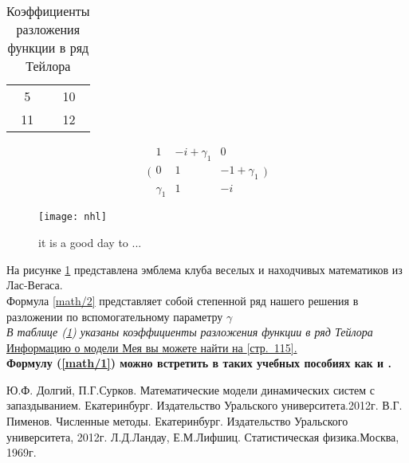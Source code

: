 \documentclass[12pt]{article}
\begin{document}
  \begin{table}
      \centering
      \begin{tabular}{ | c c |}
         \hline
           5 & 10 \\
          11 & 12 \\
          \hline
      \end{tabular}
      \caption{ Коэффициенты разложения функции в ряд Тейлора}
      \label{tab 1l}
  \end{table}
  \[ \Bigg(
  \begin{matrix}
        1 & -i+\gamma_1 & 0 \\
        0 & 1 & -1 + \gamma_1 \\
        \gamma_1 & 1 & -i
  \end{matrix}
   \Bigg)\]
\newpage
\begin{figure}
    \centering
    \texttt{[image: nhl]}
    \caption{it is a good day to ...}
    \label{picture1}
\end{figure}
На рисунке \ref{picture1} представлена эмблема клуба веселых и находчивых математиков из Лас-Вегаса.\\
\Large Формула \ref{math/2} представляет собой степенной ряд нашего решения в разложении по вспомогательному параметру $\gamma $ \\
\emph{ В таблице (\ref{tab 1l}) указаны коэффициенты разложения функции в ряд Тейлора}\\
\underline{Информацию о модели Мея вы можете найти на \cite{Dolgiy}[стр.~115].}\\
\textbf{ Формулу (\ref{math/1}) можно встретить в таких учебных пособиях как \cite{Pimenov} и \cite{landau}.}
\newpage
\begin{thebibliography}{5}
    Ю.Ф. Долгий, П.Г.Сурков. Математические модели динамических систем с запаздыванием. Екатеринбург. Издательство Уральского университета.2012г.
    В.Г. Пименов. Численные методы. Екатеринбург. Издательство Уральского университета, 2012г.
    Л.Д.Ландау, Е.М.Лифшиц. Статистическая физика.Москва, 1969г.
    \end{thebibliography}
 
\end{document}
